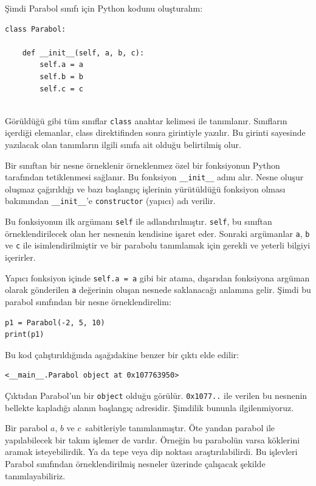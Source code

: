 \documentclass[12pt]{report}
\begin{document}
Şimdi Parabol sınıfı için Python kodunu oluşturalım:

\begin{Verbatim}[frame = single]
class Parabol:

	def __init__(self, a, b, c):
		self.a = a
		self.b = b
		self.c = c
		
\end{Verbatim}


Görüldüğü gibi tüm sınıflar \texttt{class} anahtar kelimesi ile tanımlanır. Sınıfların içerdiği elemanlar, class direktifinden sonra girintiyle yazılır. Bu girinti sayesinde yazılacak olan tanımların ilgili sınıfa ait olduğu belirtilmiş olur. 

Bir sınıftan bir nesne örneklenir örneklenmez özel bir fonksiyonun Python tarafından tetiklenmesi sağlanır. Bu fonksiyon \texttt{\_\_init\_\_} adını alır. 
Nesne oluşur oluşmaz çağırıldığı ve bazı başlangıç işlerinin yürütüldüğü fonksiyon olması bakımından \texttt{\_\_init\_\_}'e \texttt{constructor} (yapıcı) adı verilir. 

Bu fonksiyonun ilk argümanı \texttt{self} ile adlandırılmıştır. \texttt{self}, bu sınıftan örneklendirilecek olan her nesnenin kendisine işaret eder. Sonraki argümanlar \texttt{a}, \texttt{b} ve \texttt{c} ile isimlendirilmiştir ve bir parabolu tanımlamak için gerekli ve yeterli bilgiyi içerirler. 

Yapıcı fonksiyon içinde \texttt{self.a = a} gibi bir atama, dışarıdan fonksiyona argüman olarak gönderilen \texttt{a} değerinin oluşan nesnede saklanacağı anlamına gelir. Şimdi bu parabol sınıfından bir nesne örneklendirelim:

\begin{Verbatim}[frame = single]
p1 = Parabol(-2, 5, 10)
print(p1)
\end{Verbatim}

Bu kod çalıştırıldığında aşağıdakine benzer bir çıktı elde edilir:


\begin{Verbatim}[frame = single]
<__main__.Parabol object at 0x107763950>
\end{Verbatim}

Çıktıdan Parabol'un bir \texttt{object} olduğu görülür. \texttt{0x1077..} ile verilen bu nesnenin bellekte kapladığı alanın başlangıç adresidir. Şimdilik bununla ilgilenmiyoruz.

Bir parabol $a$, $b$ ve $c$ sabitleriyle tanımlanmıştır. Öte yandan parabol ile yapılabilecek bir takım işlemer de vardır. Örneğin bu parabolün varsa köklerini aramak isteyebilirdik. Ya da tepe veya dip noktası araştırılabilirdi. Bu işlevleri Parabol sınıfından örneklendirilmiş nesneler üzerinde çalışacak şekilde tanımlayabiliriz.
\end{document}
